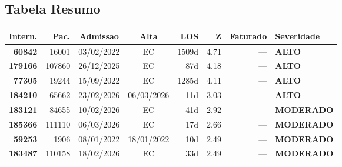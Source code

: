 \documentclass[a4paper,10pt]{article}
\begin{document}
\subsection{Tabela Resumo}
\begin{center}
\begin{longtable}{>{\scriptsize}r>{\scriptsize}r>{\scriptsize}c>{\scriptsize}c>{\scriptsize}r>{\scriptsize}r>{\scriptsize}r>{\scriptsize}l}
\toprule
\textbf{Intern.} & \textbf{Pac.} & \textbf{Admissao} & \textbf{Alta} & \textbf{LOS} & \textbf{Z} & \textbf{Faturado} & \textbf{Severidade} \\
\midrule
\endhead
\bottomrule
\endfoot

\textcolor{anomorange}{\textbf{60842}} & 16001 & 03/02/2022 & \textcolor{anomorange}{EC} & 1509d & \textcolor{anomorange}{4.71} & --- & \textcolor{anomorange}{\textbf{ALTO}} \\

\textcolor{anomorange}{\textbf{179166}} & 107860 & 26/12/2025 & \textcolor{anomorange}{EC} & 87d & \textcolor{anomorange}{4.18} & --- & \textcolor{anomorange}{\textbf{ALTO}} \\

\textcolor{anomorange}{\textbf{77305}} & 19244 & 15/09/2022 & \textcolor{anomorange}{EC} & 1285d & \textcolor{anomorange}{4.11} & --- & \textcolor{anomorange}{\textbf{ALTO}} \\

\textcolor{anomorange}{\textbf{184210}} & 65662 & 23/02/2026 & 06/03/2026 & 11d & \textcolor{anomorange}{3.03} & --- & \textcolor{anomorange}{\textbf{ALTO}} \\

\textcolor{anomyellow}{\textbf{183121}} & 84655 & 10/02/2026 & \textcolor{anomorange}{EC} & 41d & \textcolor{anomyellow}{2.92} & --- & \textcolor{anomyellow}{\textbf{MODERADO}} \\

\textcolor{anomyellow}{\textbf{185366}} & 111110 & 06/03/2026 & \textcolor{anomorange}{EC} & 17d & \textcolor{anomyellow}{2.66} & --- & \textcolor{anomyellow}{\textbf{MODERADO}} \\

\textcolor{anomyellow}{\textbf{59253}} & 1906 & 08/01/2022 & 18/01/2022 & 10d & \textcolor{anomyellow}{2.49} & --- & \textcolor{anomyellow}{\textbf{MODERADO}} \\

\textcolor{anomyellow}{\textbf{183487}} & 110158 & 18/02/2026 & \textcolor{anomorange}{EC} & 33d & \textcolor{anomyellow}{2.49} & --- & \textcolor{anomyellow}{\textbf{MODERADO}} \\


\end{longtable}
\end{center}
\end{document}
